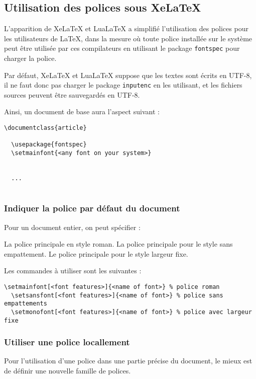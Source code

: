 \subsection{Utilisation des polices sous XeLaTeX}
L'apparition de XeLaTeX et LuaLaTeX a simplifié l'utilisation des polices pour les utilisateurs de \LaTeX, dans la mesure où toute police installée sur le système peut être utilisée par ces compilateurs en utilisant le package \texttt{fontspec} pour charger la police.

Par défaut, XeLaTeX et LuaLaTeX suppose que les textes sont écrits en UTF-8, il ne faut donc pas charger le package \texttt{inputenc} en les utilisant, et les fichiers sources peuvent être sauvegardés en UTF-8.

Ainsi, un document de base aura l'aspect suivant :

\begin{lstlisting}[language={[LaTeX]TeX}]
  \documentclass{article}

  \usepackage{fontspec}
  \setmainfont{<any font on your system>}

  
  ...
  
\end{lstlisting}

\subsubsection{Indiquer la police par défaut du document}
Pour un document entier, on peut spécifier :
\begin{itemize}
  \itemperso{}La police principale en style \og roman\fg.
  \itemperso{}La police principale pour le style \og sans empattement\fg.
  \itemperso{}Le police principale pour le style \og largeur fixe\fg.
\end{itemize}
Les commandes à utiliser sont les suivantes :

\begin{lstlisting}[language={[LaTeX]TeX}]
  \setmainfont[<font features>]{<name of font>} % police roman
  \setsansfont[<font features>]{<name of font>} % police sans empattements
  \setmonofont[<font features>]{<name of font>} % police avec largeur fixe
\end{lstlisting}

\subsubsection{Utiliser une police locallement}
Pour l'utilisation d'une police dans une partie précise du document, le mieux est de définir une nouvelle famille de polices.

